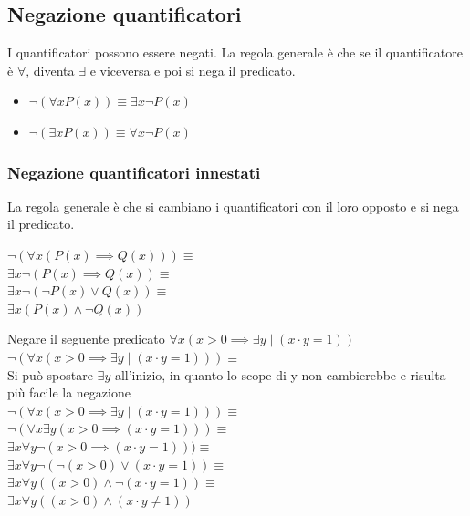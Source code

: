 \subsection{Negazione quantificatori}
I quantificatori possono essere negati. La regola generale è che se il quantificatore è $\forall$, diventa $\exists$ e viceversa e poi si nega il predicato.
\begin{itemize}
    \item $\neg(\forall xP(x)) \equiv \exists x \neg P(x)$
    \item $\neg (\exists xP(x)) \equiv \forall x \neg P(x)$
\end{itemize}

\subsubsection{Negazione quantificatori innestati}
La regola generale è che si cambiano i quantificatori con il loro opposto e si nega il predicato.
\begin{example}
$\neg(\forall x(P(x) \implies Q(x))) \equiv$ \\
$\exists x \neg(P(x) \implies Q(x)) \equiv$ \\ 
$\exists x \neg(\neg P(x) \vee Q(x)) \equiv$ \\
$\exists x(P(x) \wedge \neg Q(x))$
\end{example}
\begin{example}
Negare il seguente predicato $\forall x(x > 0 \implies \exists y \mid (x \cdot y=1))$ \\
$\neg(\forall x(x > 0 \implies \exists y \mid (x \cdot y=1))) \equiv$ \\
Si può spostare $\exists y$ all'inizio, in quanto lo scope di y non cambierebbe e risulta più facile la negazione \\
$\neg(\forall x(x > 0 \implies \exists y \mid (x \cdot y=1))) \equiv$ \\
$\neg(\forall x \exists y(x > 0 \implies (x \cdot y=1))) \equiv$ \\
$\exists x \forall y \neg(x > 0 \implies (x \cdot y=1))) \equiv$ \\
$\exists x \forall y \neg(\neg (x > 0) \vee (x \cdot y=1)) \equiv$ \\
$\exists x \forall y((x > 0) \wedge \neg (x \cdot y=1)) \equiv$ \\
$\exists x \forall y((x > 0) \wedge (x \cdot y \neq 1))$
\end{example}

